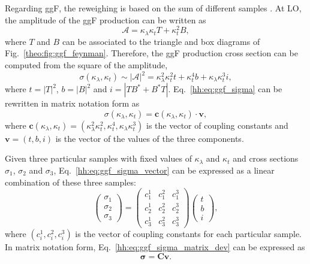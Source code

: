 \documentclass[../main.tex]{subfiles}
\begin{document}
Regarding ggF, the reweighing is based on the sum of different samples \cite{hh:analysis:ggf_reweighting}. At LO, the amplitude of the ggF production can be written as
\begin{equation}
\mathcal{A} = \kappa_\lambda\kappa_t T + \kappa_t^2 B,
\end{equation}
where $T$ and $B$ can be associated to the triangle and box diagrams of Fig.~\ref{theo:fig:ggf_feynman}. Therefore, the ggF production cross section can be computed from the square of the amplitude,
\begin{equation}
\label{hh:eq:ggf_sigma}
\sigma(\kappa_\lambda, \kappa_t) \sim |\mathcal{A}|^2 = \kappa_\lambda^2\kappa_t^2 t + \kappa_t^4b + \kappa_\lambda\kappa_t^3 i,
\end{equation}
where $t = |T|^2$, $b=|B|^2$ and $i=|TB^* + B^*T|$. Eq.~\eqref{hh:eq:ggf_sigma} can be rewritten in matrix notation form as
\begin{equation}
\label{hh:eq:ggf_sigma_vector}
\sigma(\kappa_\lambda, \kappa_t) = \mathbf{c}(\kappa_\lambda, \kappa_t) \cdot \mathbf{v},
\end{equation}
where $\mathbf{c}(\kappa_\lambda, \kappa_t) = (\kappa_\lambda^2\kappa_t^2, \kappa_t^4, \kappa_\lambda\kappa_t^3)$ is the vector of coupling constants and $\mathbf{v} = (t, b, i)$ is the vector of the values of the three components.

Given three particular samples with fixed values of $\kappa_\lambda$ and $\kappa_t$ and cross sections $\sigma_1$, $\sigma_2$ and $\sigma_3$, Eq.~\eqref{hh:eq:ggf_sigma_vector} can be expressed as a linear combination of these three samples:
\begin{equation}
\label{hh:eq:ggf_sigma_matrix_dev}
\left(
\begin{matrix}
\sigma_1 \\ \sigma_2 \\ \sigma_3
\end{matrix}
\right)
= 
\left(
\begin{matrix}
c_1^1 & c_1^2& c_1^3 \\
c_2^1 & c_2^2& c_2^3 \\
c_3^1 & c_3^2& c_3^3
\end{matrix}
\right)
\left(
\begin{matrix}
t \\ b \\ i
\end{matrix}
\right),
\end{equation}
where $(c_i^1, c_i^2, c_i^3)$ is the vector of coupling constants for each particular sample. In matrix notation form, Eq.~\eqref{hh:eq:ggf_sigma_matrix_dev} can be expressed as
\begin{equation}
\boldsymbol{\sigma} = \mathbf{C}\mathbf{v}.
\end{equation}
\end{document}
